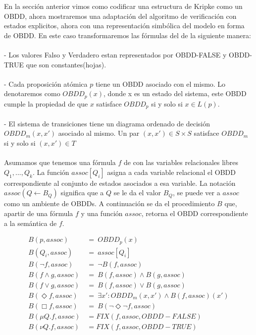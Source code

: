En la sección anterior vimos como codificar una estructura de Kripke como un OBDD, ahora mostraremos una adaptación del algoritmo de verificación con estados explicitos, ahora con una representación simbólica del modelo en forma de OBDD. En este caso transformaremos las fórmulas del {\mucalculo} de la siguiente manera\cite{Clarke:1}: \\
\\
- Los valores Falso y Verdadero estan representados por OBDD-FALSE y OBDD-TRUE que son constantes(hojas).\\
\\
- Cada proposición atómica $p$ tiene un OBDD asociado con el mismo. Lo denotaremos como $OBDD_{p}(x)$, donde x es un estado del sistema, este OBDD cumple la propiedad de que $x$ satisface $OBDD_{p}$ si y solo si $x \in L(p)$. \\
\\
- El sistema de transiciones tiene un diagrama ordenado de decisión $OBDD_{m}(x,x')$ asociado al mismo. Un par $(x,x') \in S \times S$ satisface $OBDD_{m}$ si y solo si $(x,x') \in T$ \\
\\
Asumamos que tenemos una fórmula $f$ de {\mucalculo} con las variables relacionales libres $Q_{1},...,Q_{k}$. La función $assoc[Q_{i}]$ asigna a cada variable relacional el OBDD correspondiente al conjunto de estados asociados a esa variable. La notación $assoc(Q \gets B_{Q})$ significa que a $Q$ se le da el valor $B_{Q}$, se puede ver a $assoc$ como un ambiente de OBDDs. A continuación se da el procedimiento $B$ que, apartir de una fórmula $f$ y una función $assoc$, retorna el OBDD correspondiente a la semántica de $f$.

\begin{align*}
 B(p,assoc)\ &=\ OBDD_{p}(x) \\
 B(Q_{i},assoc)\ &=\ assoc[Q_{i}] \\
 B(\neg f,assoc)\ &=\ \neg B(f,assoc) \\
 B(f \land g,assoc)\ &=\ B(f,assoc) \land B(g,assoc) \\
 B(f \lor g,assoc)\ &=\ B(f,assoc) \lor B(g,assoc) \\
 B(\Diamond f,assoc)\ &=\ \exists x' : OBDD_{m}(x,x') \land B(f,assoc)(x') \\
 B(\Box f,assoc)\ &=\ B(\neg \Diamond \neg f, assoc) \\
 B(\mu Q. f, assoc) &= FIX(f,assoc,OBDD-FALSE) \\
 B(\nu Q. f, assoc) &= FIX(f,assoc,OBDD-TRUE) \\
\end{align*}

